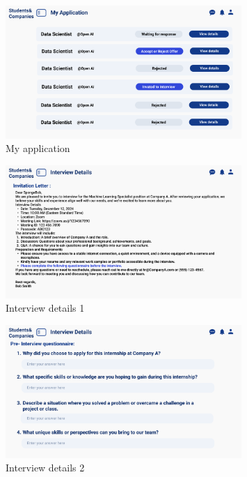 \begin{figure}[H]
    \centering
    \includegraphics[width=0.8\textwidth]{Images/UI/My Application-student.png}
    \caption{My application}\label{fig:My application}
\end{figure}

\begin{figure}[H]
    \centering
    \includegraphics[width=0.8\textwidth]{Images/UI/Interview Details-student.png}
    \caption{Interview details 1}\label{fig:Interview details 1}
\end{figure}

\begin{figure}[H]
    \centering
    \includegraphics[width=0.8\textwidth]{Images/UI/Interview Details2-student.png}
    \caption{Interview details 2}\label{fig:Interview details 2}
\end{figure}

